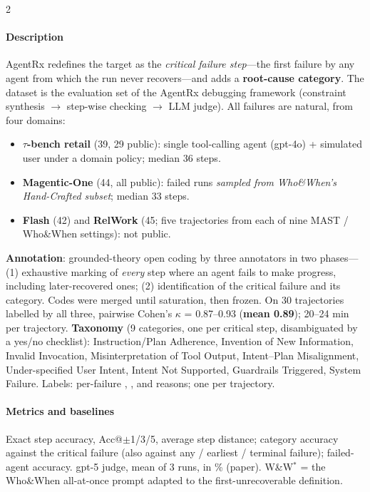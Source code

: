 \begin{multicols}{2}
\paragraph{Description} AgentRx redefines the target as the \emph{critical failure step}---the first failure by any agent from which the run never recovers---and adds a \textbf{root-cause category}. The dataset is the evaluation set of the AgentRx debugging framework (constraint synthesis $\to$ step-wise checking $\to$ LLM judge). All failures are natural, from four domains:
\begin{itemize}
\item \textbf{$\tau$-bench retail} (39, 29 public): single tool-calling agent (gpt-4o) + simulated user under a domain policy; median 36 steps.
\item \textbf{Magentic-One} (44, all public): failed runs \emph{sampled from Who\&When's Hand-Crafted subset}; median 33 steps.
\item \textbf{Flash} (42) and \textbf{RelWork} (45; five trajectories from each of nine MAST / Who\&When settings): not public.
\end{itemize}
\textbf{Annotation}: grounded-theory open coding by three annotators in two phases---(1) exhaustive marking of \emph{every} step where an agent fails to make progress, including later-recovered ones; (2) identification of the critical failure and its category. Codes were merged until saturation, then frozen. On 30 trajectories labelled by all three, pairwise Cohen's $\kappa$ = 0.87--0.93 (\textbf{mean 0.89}); 20--24 min per trajectory. \textbf{Taxonomy} (9 categories, one per critical step, disambiguated by a yes/no checklist): Instruction/Plan Adherence, Invention of New Information, Invalid Invocation, Misinterpretation of Tool Output, Intent--Plan Misalignment, Under-specified User Intent, Intent Not Supported, Guardrails Triggered, System Failure. Labels: per-failure , ,  and reasons; one  per trajectory.

\paragraph{Metrics and baselines} Exact step accuracy, Acc@$\pm$1/3/5, average step distance; category accuracy against the critical failure (also against any / earliest / terminal failure); failed-agent accuracy. gpt-5 judge, mean of 3 runs, in \% (paper). W\&W$^*$ = the Who\&When all-at-once prompt adapted to the first-unrecoverable definition.


\end{multicols}

